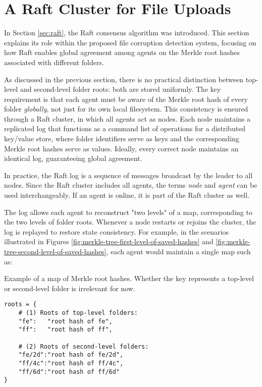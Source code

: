 \section{A Raft Cluster for File Uploads} \label{sec:raft-cluster-for-file-uploads}

In Section \ref{sec:raft}, the Raft consensus algorithm was introduced. This section explains its role within the proposed file corruption detection system, focusing on how Raft enables global agreement among agents on the Merkle root hashes associated with different folders.

As discussed in the previous section, there is no practical distinction between top-level and second-level folder roots: both are stored uniformly. The key requirement is that each agent must be aware of the Merkle root hash of every folder \emph{globally}, not just for its own local filesystem. This consistency is ensured through a Raft cluster, in which all agents act as nodes. Each node maintains a replicated log that functions as a command list of operations for a distributed key/value store, where folder identifiers serve as keys and the corresponding Merkle root hashes serve as values. Ideally, every correct node maintains an identical log, guaranteeing global agreement.

In practice, the Raft log is a sequence of messages broadcast by the leader to all nodes. Since the Raft cluster includes all agents, the terms \emph{node} and \emph{agent} can be used interchangeably. If an agent is online, it is part of the Raft cluster as well.

The log allows each agent to reconstruct "two levels" of a map, corresponding to the two levels of folder roots. Whenever a node restarts or rejoins the cluster, the log is replayed to restore state consistency. For example, in the scenarios illustrated in Figures \ref{fig:merkle-tree-first-level-of-saved-hashes} and \ref{fig:merkle-tree-second-level-of-saved-hashes}, each agent would maintain a single map such as:

\begin{listing}[H]
\caption{Example of a map of Merkle root hashes. Whether the key represents a top-level or second-level folder is irrelevant for now.}
\label{code:map-of-roots}
\begin{verbatim}
roots = {
    # (1) Roots of top-level folders:
    "fe":   "root hash of fe",
    "ff":   "root hash of ff",
    
    # (2) Roots of second-level folders:
    "fe/2d":"root hash of fe/2d",
    "ff/4c":"root hash of ff/4c",
    "ff/6d":"root hash of ff/6d"
}
\end{verbatim}
\end{listing}

